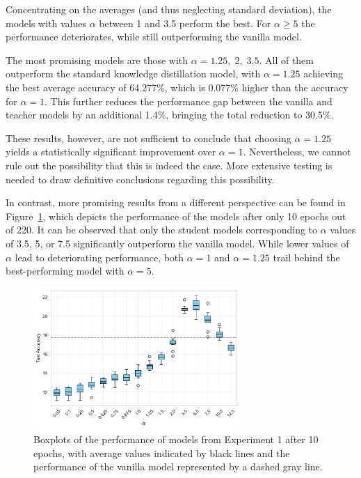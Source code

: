 Concentrating on the averages (and thus neglecting standard deviation), the models with values $\alpha$ between 1 and 3.5 perform the best. For $\alpha \geq 5$ the performance deteriorates, while still outperforming the vanilla model.

The most promising models are those with $\alpha = 1.25,\; 2,\; 3.5$. All of them outperform the standard knowledge distillation model, with $\alpha = 1.25$ achieving the best average accuracy of 64.277\%, which is 0.077\% higher than the accuracy for $\alpha = 1$. This further reduces the performance gap between the vanilla and teacher models by an additional 1.4\%, bringing the total reduction to 30.5\%.

These results, however, are not sufficient to conclude that choosing $\alpha = 1.25$ yields a statistically significant improvement over $\alpha = 1$. Nevertheless, we cannot rule out the possibility that this is indeed the case. More extensive testing is needed to draw definitive conclusions regarding this possibility.

In contrast, more promising results from a different perspective can be found in Figure~\ref{fig:exp1_box_10}, which depicts the performance of the models after only 10 epochs out of 220. It can be observed that only the student models corresponding to $\alpha$ values of 3.5, 5, or 7.5 significantly outperform the vanilla model. While lower values of $\alpha$ lead to deteriorating performance, both $\alpha = 1$ and $\alpha = 1.25$ trail behind the best-performing model with $\alpha = 5$.

\begin{figure}[h!]
	\centering
	\includegraphics[width=0.7\textwidth]{../img/exp1_box_10.pdf}
	\caption{Boxplots of the performance of models from Experiment 1 after 10 epochs, with average values indicated by black lines and the performance of the vanilla model represented by a dashed gray line.}
	\label{fig:exp1_box_10}
\end{figure}

